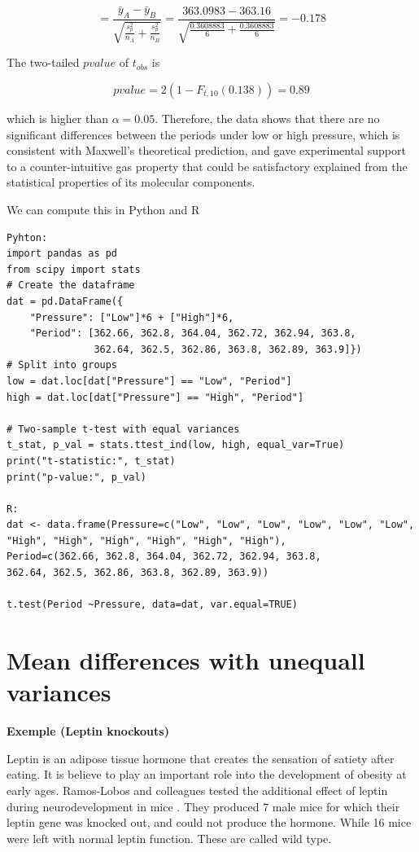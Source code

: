 \documentclass[
]{book}
\begin{document}
\[=\frac{\bar{y}_A-\bar{y}_B }{\sqrt{\frac{s^2_p}{n_A}+\frac{s^2_p}{n_B}}}=\frac{363.0983-363.16}{\sqrt{\frac{0.3608883}{6}+\frac{0.3608883}{6}}}=-0.178\]

The two-tailed \(pvalue\) of \(t_{obs}\) is

\[pvalue=2(1-F_{t,10}(0.138))=0.89\]

which is higher than \(\alpha=0.05\). Therefore, the data shows that there are no significant differences between the periods under low or high pressure, which is consistent with Maxwell's theoretical prediction, and gave experimental support to a counter-intuitive gas property that could be satisfactory explained from the statistical properties of its molecular components.

We can compute this in Python and R

\begin{verbatim}
Pyhton:
import pandas as pd
from scipy import stats
# Create the dataframe
dat = pd.DataFrame({
    "Pressure": ["Low"]*6 + ["High"]*6,
    "Period": [362.66, 362.8, 364.04, 362.72, 362.94, 363.8,
               362.64, 362.5, 362.86, 363.8, 362.89, 363.9]})
# Split into groups
low = dat.loc[dat["Pressure"] == "Low", "Period"]
high = dat.loc[dat["Pressure"] == "High", "Period"]

# Two-sample t-test with equal variances
t_stat, p_val = stats.ttest_ind(low, high, equal_var=True)
print("t-statistic:", t_stat)
print("p-value:", p_val)

R:
dat <- data.frame(Pressure=c("Low", "Low", "Low", "Low", "Low", "Low",
"High", "High", "High", "High", "High", "High"), 
Period=c(362.66, 362.8, 364.04, 362.72, 362.94, 363.8, 
362.64, 362.5, 362.86, 363.8, 362.89, 363.9))

t.test(Period ~Pressure, data=dat, var.equal=TRUE)
\end{verbatim}

\hypertarget{mean-differences-with-unequall-variances}{%
\section{Mean differences with unequall variances}\label{mean-differences-with-unequall-variances}}

\textbf{Exemple (Leptin knockouts)}

Leptin is an adipose tissue hormone that creates the sensation of satiety after eating. It is believe to play an important role into the development of obesity at early ages. Ramos-Lobos and colleagues tested the additional effect of leptin during neurodevelopment in mice \citep{Ramos-Lobo2019}. They produced 7 male mice for which their leptin gene was knocked out, and could not produce the hormone. While 16 mice were left with normal leptin function. These are called wild type.
\end{document}
